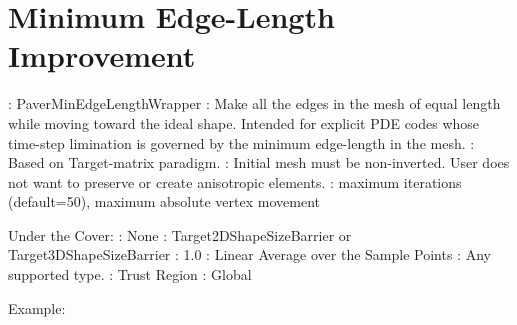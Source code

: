 \newpage

\section{Minimum Edge-Length Improvement} \label{sec:PaverMinEdgeLengthWrapper}

: PaverMinEdgeLengthWrapper \newline
{}: Make all the edges in the mesh of equal length while 
moving toward the ideal shape. Intended for explicit PDE codes whose 
time-step limination is governed by the minimum edge-length in the mesh. \newline
{}: Based on Target-matrix paradigm. \newline
{}: Initial mesh must be non-inverted. User does not want to preserve or create anisotropic elements. \newline 
{}: maximum iterations (default=50), maximum absolute vertex movement \newline \newline

\noindent Under the Cover: \newline
{}: None \newline
{}:  Target2DShapeSizeBarrier or Target3DShapeSizeBarrier \newline
{}: 1.0 \newline
{}: Linear Average over the Sample Points \newline
{}: Any supported type.  \newline
{}: Trust Region \newline
{}: Global \newline

\noindent Example: \newline

